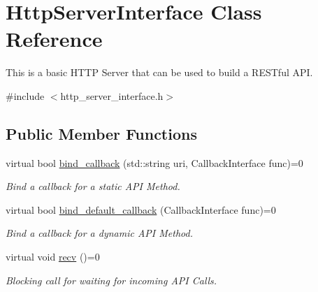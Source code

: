 \hypertarget{classHttpServerInterface}{}\section{Http\+Server\+Interface Class Reference}
\label{classHttpServerInterface}


This is a basic H\+T\+TP Server that can be used to build a R\+E\+S\+Tful A\+PI.  




{\ttfamily \#include $<$http\+\_\+server\+\_\+interface.\+h$>$}

\subsection*{Public Member Functions}
\begin{DoxyCompactItemize}
\item 
virtual bool \hyperlink{classHttpServerInterface_a6aa54efaf6f176d985c7faa57e1aa7fd}{bind\+\_\+callback} (std\+::string uri, Callback\+Interface func)=0\hypertarget{classHttpServerInterface_a6aa54efaf6f176d985c7faa57e1aa7fd}{}\label{classHttpServerInterface_a6aa54efaf6f176d985c7faa57e1aa7fd}

\begin{DoxyCompactList}\small\item\em Bind a callback for a static A\+PI Method. \end{DoxyCompactList}\item 
virtual bool \hyperlink{classHttpServerInterface_a398064a0d7fb0c7e52d94ccfcbb6d89a}{bind\+\_\+default\+\_\+callback} (Callback\+Interface func)=0\hypertarget{classHttpServerInterface_a398064a0d7fb0c7e52d94ccfcbb6d89a}{}\label{classHttpServerInterface_a398064a0d7fb0c7e52d94ccfcbb6d89a}

\begin{DoxyCompactList}\small\item\em Bind a callback for a dynamic A\+PI Method. \end{DoxyCompactList}\item 
virtual void \hyperlink{classHttpServerInterface_a350f4321505079d9c440ce4a4372044f}{recv} ()=0\hypertarget{classHttpServerInterface_a350f4321505079d9c440ce4a4372044f}{}\label{classHttpServerInterface_a350f4321505079d9c440ce4a4372044f}

\begin{DoxyCompactList}\small\item\em Blocking call for waiting for incoming A\+PI Calls. \end{DoxyCompactList}\end{DoxyCompactItemize}


